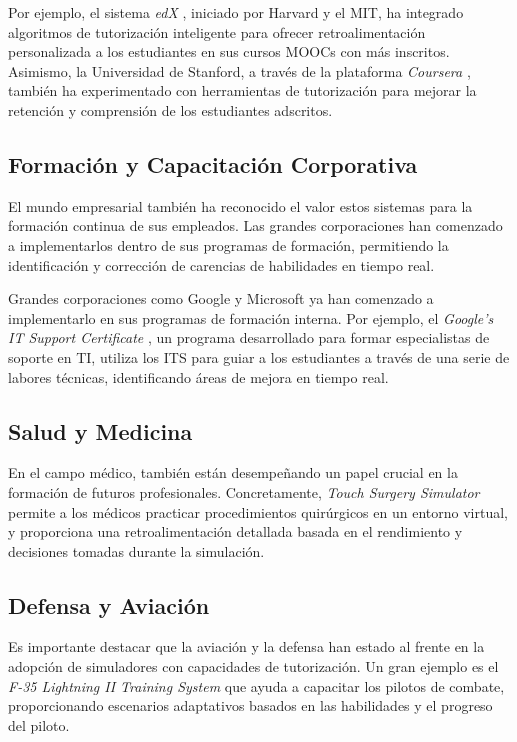 Por ejemplo, el sistema \textit{edX} \cite{edx}, iniciado por Harvard y el MIT, ha integrado algoritmos de tutorización inteligente para ofrecer retroalimentación personalizada a los estudiantes en sus cursos MOOCs con más inscritos. Asimismo, la Universidad de Stanford, a través de la plataforma \textit{Coursera} \cite{coursera}, también ha experimentado con herramientas de tutorización para mejorar la retención y comprensión de los estudiantes adscritos. 

\subsection{Formación y Capacitación Corporativa}

El mundo empresarial también ha reconocido el valor estos sistemas para la formación continua de sus empleados. Las grandes corporaciones han comenzado a implementarlos dentro de sus programas de formación, permitiendo la identificación y corrección de carencias de habilidades en tiempo real.

Grandes corporaciones como Google y Microsoft ya han comenzado a implementarlo en sus programas de formación interna. Por ejemplo, el \textit{Google's IT Support Certificate} \cite{googleitsupport}, un programa desarrollado para formar especialistas de soporte en TI, utiliza los ITS para guiar a los estudiantes a través de una serie de labores técnicas, identificando áreas de mejora en tiempo real.

\subsection{Salud y Medicina}

En el campo médico, también están desempeñando un papel crucial en la formación de futuros profesionales. Concretamente, \textit{Touch Surgery Simulator} \cite{touchsurgery} permite a los médicos practicar procedimientos quirúrgicos en un entorno virtual, y proporciona una retroalimentación detallada basada en el rendimiento y decisiones tomadas durante la simulación.

\subsection{Defensa y Aviación}

Es importante destacar que la aviación y la defensa han estado al frente en la adopción de simuladores con capacidades de tutorización. Un gran ejemplo es el \textit{F-35 Lightning II Training System} \cite{f35training} que ayuda a capacitar los pilotos de combate, proporcionando escenarios adaptativos basados en las habilidades y el progreso del piloto.

